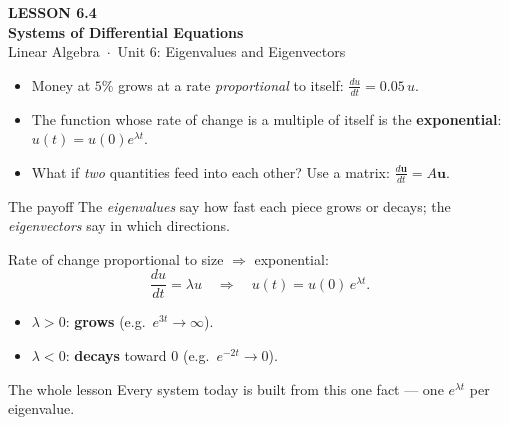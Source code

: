 \documentclass[aspectratio=169, 11pt]{beamer}
\newcommand{\uu}{\mathbf{u}}
\begin{document}
{
\begin{frame}[plain]
  \vspace{2.8cm}\hspace{0.55cm}%
  \begin{minipage}{0.9\textwidth}
    {\color{goldacc}\bfseries\small LESSON 6.4}\\[0.5cm]
    {\color{white}\bfseries\LARGE Systems of Differential Equations}\\[1.0cm]
    {\color{blushmid}\small Linear Algebra~$\cdot$~Unit 6: Eigenvalues and Eigenvectors}
  \end{minipage}
\end{frame}
}

\begin{frame}[t, plain]
  \begin{itemize}
    \setlength{\itemsep}{7pt}
    \item Money at $5\%$ grows at a rate \emph{proportional} to itself: $\frac{du}{dt}=0.05\,u$.
    \item The function whose rate of change is a multiple of itself is the \textbf{exponential}: $u(t)=u(0)e^{\lambda t}$.
    \item What if \emph{two} quantities feed into each other? Use a matrix: $\frac{d\uu}{dt}=A\uu$.
  \end{itemize}
  \begin{block}{The payoff}
    The \emph{eigenvalues} say how fast each piece grows or decays; the \emph{eigenvectors} say in which
    directions.
  \end{block}
\end{frame}

\begin{frame}[t, plain]
  Rate of change proportional to size $\Rightarrow$ exponential:
  \[ \frac{du}{dt}=\lambda u \quad\Longrightarrow\quad u(t)=u(0)\,e^{\lambda t}. \]
  \begin{itemize}
    \setlength{\itemsep}{6pt}
    \item $\lambda>0$: \textbf{grows} (e.g.\ $e^{3t}\to\infty$).
    \item $\lambda<0$: \textbf{decays} toward $0$ (e.g.\ $e^{-2t}\to0$).
  \end{itemize}
  \begin{block}{The whole lesson}
    Every system today is built from this one fact --- one $e^{\lambda t}$ per eigenvalue.
  \end{block}
\end{frame}
\end{document}
